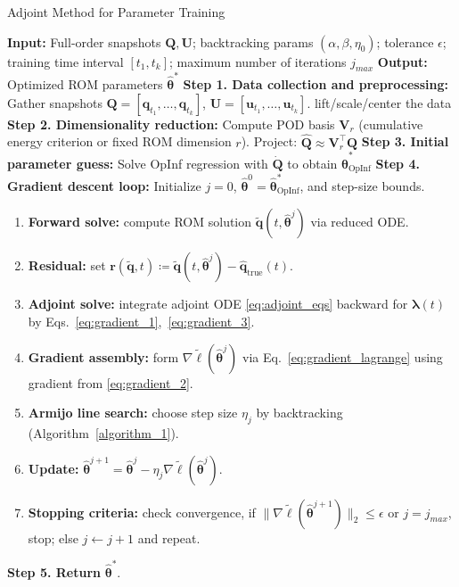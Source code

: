 \begin{center}
\begin{minipage}{0.95\textwidth}
\begin{algorithm}[H]
\caption{Adjoint Method for Parameter Training}\label{algorithm_2}
\SetAlgoNoLine
\textbf{Input:} Full-order snapshots $\mathbf{Q},\mathbf{U}$; backtracking params $(\alpha,\beta,\eta_0)$; tolerance $\epsilon$; training time interval $[t_1, t_k]$; maximum number of iterations $j_{max}$\;
\textbf{Output:} Optimized ROM parameters $\hat{\bm\theta}^*$\;
\vspace{0.3cm}
\textbf{Step 1. Data collection and preprocessing:} Gather snapshots $\mathbf{Q}=[\mathbf{q}_{t_1},\dots,\mathbf{q}_{t_k}]$, $\mathbf{U}=[\mathbf{u}_{t_1},\dots,\mathbf{u}_{t_k}]$.
\quad [Optional] lift/scale/center the data\;
\textbf{Step 2. Dimensionality reduction:} Compute POD basis $\mathbf{V}_r$ (cumulative energy criterion or fixed ROM dimension $r$). Project: $\hat{\mathbf{Q}} \approx \mathbf{V}_r^\top\mathbf{Q}$\;
\textbf{Step 3. Initial parameter guess:} Solve OpInf regression with $\dot{\mathbf{Q}}$ to obtain $\hat{\bm\theta}^{*}_{\text{OpInf}}$\;
\textbf{Step 4. Gradient descent loop:}
Initialize $j=0$, $\hat{\bm\theta}^0=\hat{\bm\theta}^{*}_{\text{OpInf}}$, and step-size bounds.
\begin{enumerate}[label=\arabic*.]
  \item \textbf{Forward solve:}
    compute ROM solution $\tilde{\mathbf{q}}(t,\hat{\bm\theta}^j)$ via reduced ODE.
  \item \textbf{Residual:}
    set $\mathbf{r}(\tilde{\mathbf{q}},t)\coloneqq\tilde{\mathbf{q}}(t,\hat{\bm\theta}^j) - \hat{\mathbf{q}}_{\text{true}}(t)$.
  \item \textbf{Adjoint solve:}
    integrate adjoint ODE \eqref{eq:adjoint_eqs} backward for $\bm\lambda(t)$ by Eqs.~\eqref{eq:gradient_1},~\eqref{eq:gradient_3}.
  \item \textbf{Gradient assembly:}
    form $\nabla\tilde\ell(\hat{\bm\theta}^j)$ via Eq.~\eqref{eq:gradient_lagrange} using gradient from \eqref{eq:gradient_2}.
  \item \textbf{Armijo line search:}
    choose step size $\eta_j$ by backtracking (Algorithm~\ref{algorithm_1}).
  \item \textbf{Update:}
    $\hat{\bm\theta}^{j+1}=\hat{\bm\theta}^j-\eta_j\nabla\tilde\ell(\hat{\bm\theta}^j)$.
  \item \textbf{Stopping criteria:}
    check convergence, if $\|\nabla\tilde\ell(\hat{\bm\theta}^{j+1})\|_2\le\epsilon$ or $j=j_{max}$, stop; else $j\leftarrow j+1$ and repeat.
\end{enumerate}
\textbf{Step 5. Return} {$\hat{\bm\theta}^*$}.
\end{algorithm}
\end{minipage}
\end{center}


